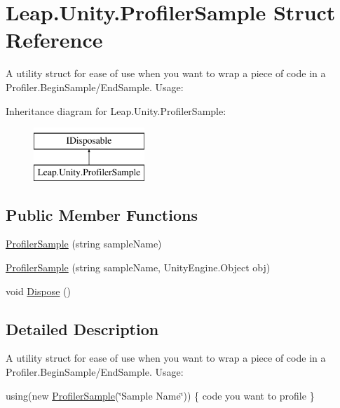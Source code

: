 \hypertarget{struct_leap_1_1_unity_1_1_profiler_sample}{}\section{Leap.\+Unity.\+Profiler\+Sample Struct Reference}
\label{struct_leap_1_1_unity_1_1_profiler_sample}


A utility struct for ease of use when you want to wrap a piece of code in a Profiler.\+Begin\+Sample/\+End\+Sample. Usage\+:  


Inheritance diagram for Leap.\+Unity.\+Profiler\+Sample\+:\begin{figure}[H]
\begin{center}
\leavevmode
\includegraphics[height=2.000000cm]{struct_leap_1_1_unity_1_1_profiler_sample}
\end{center}
\end{figure}
\subsection*{Public Member Functions}
\begin{DoxyCompactItemize}
\item 
\mbox{\hyperlink{struct_leap_1_1_unity_1_1_profiler_sample_a0c710010a1ba9e1f09234c890992ed03}{Profiler\+Sample}} (string sample\+Name)
\item 
\mbox{\hyperlink{struct_leap_1_1_unity_1_1_profiler_sample_a56e267a950cc3a969f59b30c0189a6f8}{Profiler\+Sample}} (string sample\+Name, Unity\+Engine.\+Object obj)
\item 
void \mbox{\hyperlink{struct_leap_1_1_unity_1_1_profiler_sample_ad490a07e58eeb06e517e63389dbd2d41}{Dispose}} ()
\end{DoxyCompactItemize}


\subsection{Detailed Description}
A utility struct for ease of use when you want to wrap a piece of code in a Profiler.\+Begin\+Sample/\+End\+Sample. Usage\+: 

using(new \mbox{\hyperlink{struct_leap_1_1_unity_1_1_profiler_sample}{Profiler\+Sample}}(\char`\"{}\+Sample Name\char`\"{})) \{ code you want to profile \} 

